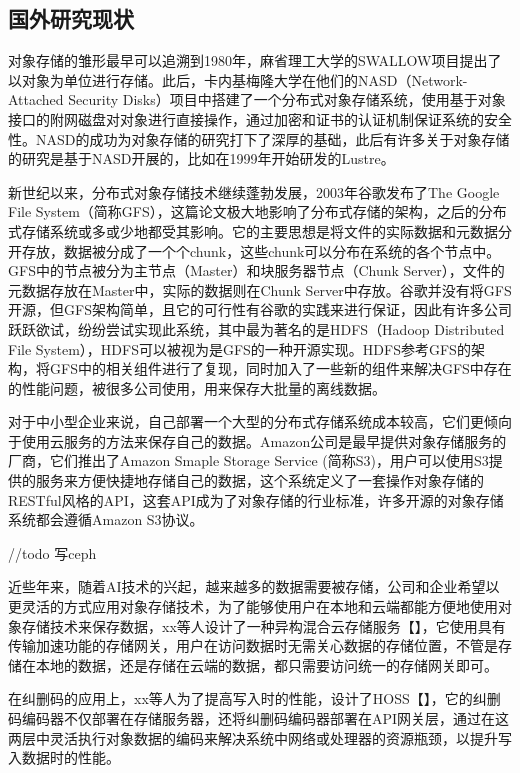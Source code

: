 \subsection{国外研究现状}%
对象存储的雏形最早可以追溯到1980年，麻省理工大学的SWALLOW项目提出了以对象为单位进行存储\cite{7}。此后，卡内基梅隆大学在他们的NASD\cite{8}（Network-Attached Security Disks）项目中搭建了一个分布式对象存储系统，使用基于对象接口的附网磁盘对对象进行直接操作，通过加密和证书的认证机制保证系统的安全性。NASD的成功为对象存储的研究打下了深厚的基础，此后有许多关于对象存储的研究是基于NASD开展的，比如在1999年开始研发的Lustre\cite{9}。

新世纪以来，分布式对象存储技术继续蓬勃发展，2003年谷歌发布了The Google File System（简称GFS）\cite{10}，这篇论文极大地影响了分布式存储的架构，之后的分布式存储系统或多或少地都受其影响。它的主要思想是将文件的实际数据和元数据分开存放，数据被分成了一个个chunk，这些chunk可以分布在系统的各个节点中。GFS中的节点被分为主节点（Master）和块服务器节点（Chunk Server），文件的元数据存放在Master中，实际的数据则在Chunk Server中存放。谷歌并没有将GFS开源，但GFS架构简单，且它的可行性有谷歌的实践来进行保证，因此有许多公司跃跃欲试，纷纷尝试实现此系统，其中最为著名的是HDFS\cite{11}（Hadoop Distributed File System），HDFS可以被视为是GFS的一种开源实现。HDFS参考GFS的架构，将GFS中的相关组件进行了复现，同时加入了一些新的组件来解决GFS中存在的性能问题，被很多公司使用，用来保存大批量的离线数据。

对于中小型企业来说，自己部署一个大型的分布式存储系统成本较高，它们更倾向于使用云服务的方法来保存自己的数据。Amazon公司是最早提供对象存储服务的厂商，它们推出了Amazon Smaple Storage Service\cite{12} (简称S3)，用户可以使用S3提供的服务来方便快捷地存储自己的数据，这个系统定义了一套操作对象存储的RESTful风格的API\cite{13}，这套API成为了对象存储的行业标准，许多开源的对象存储系统都会遵循Amazon S3协议。

//todo 写ceph

近些年来，随着AI技术的兴起，越来越多的数据需要被存储，公司和企业希望以更灵活的方式应用对象存储技术，为了能够使用户在本地和云端都能方便地使用对象存储技术来保存数据，xx等人设计了一种异构混合云存储服务【】，它使用具有传输加速功能的存储网关，用户在访问数据时无需关心数据的存储位置，不管是存储在本地的数据，还是存储在云端的数据，都只需要访问统一的存储网关即可。

在纠删码的应用上，xx等人为了提高写入时的性能，设计了HOSS【】，它的纠删码编码器不仅部署在存储服务器，还将纠删码编码器部署在API网关层，通过在这两层中灵活执行对象数据的编码来解决系统中网络或处理器的资源瓶颈，以提升写入数据时的性能。

